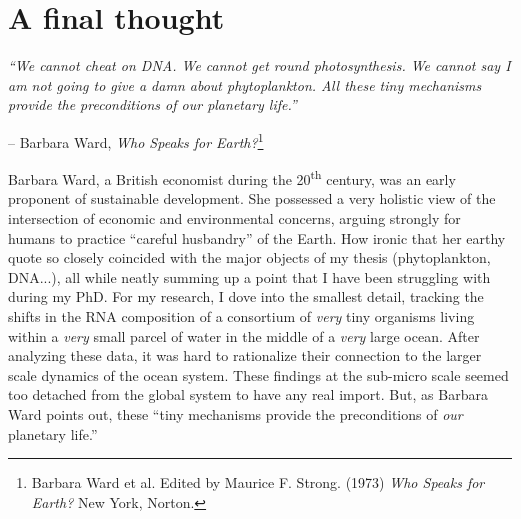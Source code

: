 \clearpage

\section{A final thought}

\textit{``We cannot cheat on DNA. We cannot get round photosynthesis. We cannot say I am not going to give a damn about phytoplankton. All these tiny mechanisms provide the preconditions of our planetary life.'' }
\begin{flushright}-- Barbara Ward, \textit{Who Speaks for Earth?}\footnote{Barbara Ward et al. Edited by Maurice F. Strong. (1973) \textit{Who Speaks for Earth?} New York, Norton. }\end{flushright}

Barbara Ward, a British economist during the 20\textsuperscript{th} century, was an early proponent of sustainable development. She possessed a very holistic view of the intersection of economic and environmental concerns, arguing strongly for humans to practice ``careful husbandry'' of the Earth. 
How ironic that her earthy quote so closely coincided with the major objects of my thesis (phytoplankton, DNA...), all while neatly summing up a point that I have been struggling with during my PhD. For my research, I dove into the smallest detail, tracking the shifts in the RNA composition of a consortium of \textit{very} tiny organisms living within a \textit{very} small parcel of water in the middle of a \textit{very} large ocean. After analyzing these data, it was hard to rationalize their connection to the larger scale dynamics of the ocean system. These findings at the sub-micro scale seemed too detached from the global system to have any real import. But, as Barbara Ward points out, these ``tiny mechanisms provide the preconditions of \textit{our} planetary life.'' 


